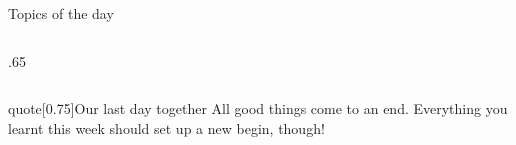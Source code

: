 
\PrepareURLsymbol[PB]
\begin{frame}
    \titlepage
\end{frame}
\begin{frame}[label=toc,plain,noframenumbering]{Topics of the day}
    \begin{columns}
        \begin{column}{.65\textwidth}
            \hspace*{0mm}
            \begin{minipage}[0.5\textheight]{\textwidth}
                \tableofcontents[subsubsectionstyle=hide]
            \end{minipage}
        \end{column}
        \hfill
    \end{columns}
    \vspace{5mm}
    \begin{varblock}{quote}[0.75\textwidth]{Our last day together}
        \normalfont\small
        All good things come to an end.
        Everything you learnt this week should set up a new begin, though!
    \end{varblock}
\end{frame}
